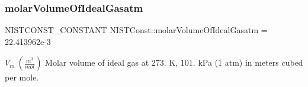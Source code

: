 \subsubsection{\texorpdfstring{molar\+Volume\+Of\+Ideal\+Gasatm}{molarVolumeOfIdealGasatm}}
{\footnotesize\ttfamily N\+I\+S\+T\+C\+O\+N\+S\+T\+\_\+\+C\+O\+N\+S\+T\+A\+NT N\+I\+S\+T\+Const\+::molar\+Volume\+Of\+Ideal\+Gasatm = 22.\+413962e-\/3}

$V_m \ (\frac{m^3}{mol})$ Molar volume of ideal gas at 273. K, 101. k\+Pa (1 atm) in meters cubed per mole. 